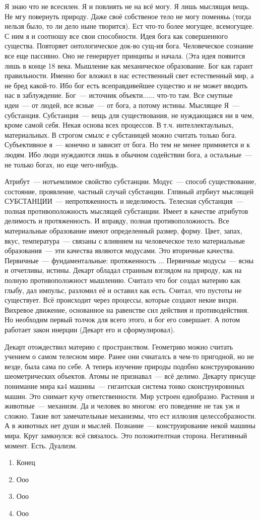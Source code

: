 Я знаю что не всесилен. Я и повлиять не на всё могу. Я лишь мыслящая вещь. Не мгу повернуть природу. Даже своё собственое тело не могу поменяьь (тогда нельзя было, то ли дело ныне творится). Ест  что-то более могущее, всемогущее. С ним я и соотношу все свои способности. Идея бога как совершенного существа. Повторяет онтологическое док-во сущ-ия бога.
Человеческое сознание все еще пассивно. Оно не генерирует принципы и начала. (Эта идея появится лишь в конце 18 века. Мышление как механическое образование. Бог как гарант правильности. Именно бог вложил в нас естественный свет естественный мир, а не бред какой-то. Ибо бог есть всеправдивейшее существо и не может вводить нас в заблуждение. Бог~--- источник объекти...... что-то там.
Все смутные идеи~--- от людей, все ясные~--- от бога, а потому истины. Мыслящее Я~--- субстанция.
Субстанция~--- вещь для существования, не нуждающаяся ни в чем, кроме самой себя. Некая основа всех процессов. В т.ч. интеллектаульных, материальных. В строгом смылс е субстаницей можно считать только бога. Субъективное я~--- конечно и зависит от бога. Но тем не менее примняется и к людям. Ибо люди нуждаются лишь в обычном содействии бога, а остальные~--- не только богах, но еще чего-нибудь.

Атрибут~--- нотъемлимое свойство субстанции. Модус~--- способ существование, состояние, проявление, частный случай субстанции. Глпвный атрбиут мыслящей СУБСТАНЦИИ~--- непротяженность и неделимость. Телесная субстанция~--- полная противоположность мыслящей субстанции. Имеет в качестве атрибутов делимость и протяженность. И вправду, полная противоположность. Все материальные образование имеют определенный размер, форму. Цвет, запах, вкус, температура~--- связаны с влиянием на человеческое тело материальные образования~--- эти качества являются модусами. Это вторичные качества. Первичные~--- фундаментальные: протяженность ...
Первичные модусы~--- ясны и отчетливы, истины.
Декарт обладал странным взглядом на природу, как на полную противоположност мышлению. Считалэ что бог создал материю как глыбу, дал импульс, разломил её и оставил как есть. Считал, что пустоты не существует. Всё происходит через процессы, которые создают некие вихри. Вихревое движение, основанное на равенстве сил действия и противодействия. Но необходим первый толчок для всего этого, и бог его совершает. А потом работает закон инерции (Декарт его и сформулировал).

Декарт отождествил материю с пространством. Геометрию можно считать учением о самом телесном мире. Ранее они счиаталсь в чем-то пригодной, но не везде, была сама по себе. А теперь изучение природы подобно конструированию шеометрических объектов. Атомы не признавал~--- всё делимо. Декарту присуще понимание мира ка4 машины~--- гигантская система тонко сконструировнных машин. Это снимает кучу ответственности. Мир устроен едиобразно. Растения и животные~--- механизм. Да и человек во многом: его поведение не так уж и сложно. Такие вот замечательные механизмы, что ест иллюзия целессобразности. А в животных нет души и мыслей. Познание~--- конструирование некой  машины мира. Круг замкнулся: всё связалось. Это положителтная сторона.
Негативный момент. Есть. Дуализм.

\begin{enumerate}
	\item Конец
	\item Ооо
	\item Ооо
	\item Ооо
\end{enumerate}
